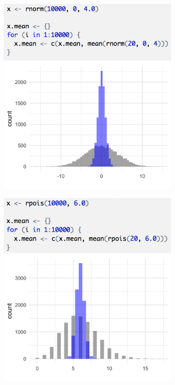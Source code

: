 \begin{figure}[h]
\begin{center}
    \begin{subfigure}{0.4\textwidth}
    \includegraphics[width=\textwidth]{img/clt-rnorm-code.png}
    \includegraphics[width=\textwidth]{img/hyp-norm-mean.png}
    \end{subfigure}
    \begin{subfigure}{0.4\textwidth}
    \includegraphics[width=\textwidth]{img/clt-rpois-code.png}
    \includegraphics[width=\textwidth]{img/hyp-pois-mean.png}

\end{subfigure}
\end{center}
\end{figure}
